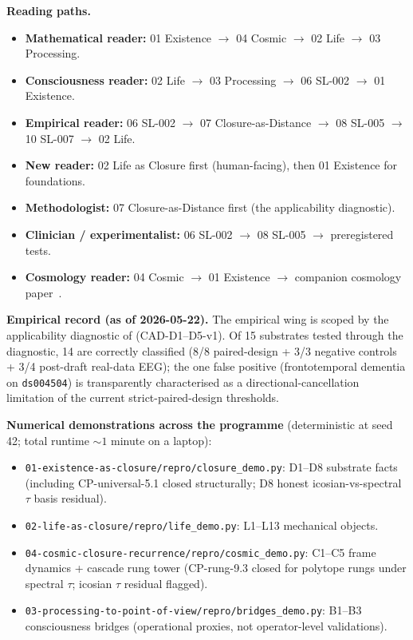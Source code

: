 \documentclass[11pt]{article}
\theoremstyle{plain}
\theoremstyle{definition}
\theoremstyle{remark}
\begin{document}
\textbf{Reading paths.}
\begin{itemize}[leftmargin=2em]
\item \textbf{Mathematical reader:} 01 Existence $\to$ 04 Cosmic $\to$ 02 Life $\to$ 03 Processing.
\item \textbf{Consciousness reader:} 02 Life $\to$ 03 Processing $\to$ 06 SL-002 $\to$ 01 Existence.
\item \textbf{Empirical reader:} 06 SL-002 $\to$ 07 Closure-as-Distance $\to$ 08 SL-005 $\to$ 10 SL-007 $\to$ 02 Life.
\item \textbf{New reader:} 02 Life as Closure first (human-facing), then 01 Existence for foundations.
\item \textbf{Methodologist:} 07 Closure-as-Distance first (the applicability diagnostic).
\item \textbf{Clinician / experimentalist:} 06 SL-002 $\to$ 08 SL-005 $\to$ preregistered tests.
\item \textbf{Cosmology reader:} 04 Cosmic $\to$ 01 Existence $\to$ companion cosmology paper~\citep{SmartHypersphereCosmology}.
\end{itemize}

\textbf{Empirical record (as of 2026-05-22).} The empirical wing is scoped by the applicability diagnostic of \citet{SmartClosureDistance} (CAD-D1--D5-v1). Of 15 substrates tested through the diagnostic, 14 are correctly classified (8/8 paired-design + 3/3 negative controls + 3/4 post-draft real-data EEG); the one false positive (frontotemporal dementia on \texttt{ds004504}) is transparently characterised as a directional-cancellation limitation of the current strict-paired-design thresholds.

\textbf{Numerical demonstrations across the programme} (deterministic at seed 42; total runtime $\sim 1$ minute on a laptop):
\begin{itemize}[leftmargin=2em]
\item \texttt{01-existence-as-closure/repro/closure\_demo.py}: D1--D8 substrate facts (including CP-universal-5.1 closed structurally; D8 honest icosian-vs-spectral $\tau$ basis residual).
\item \texttt{02-life-as-closure/repro/life\_demo.py}: L1--L13 mechanical objects.
\item \texttt{04-cosmic-closure-recurrence/repro/cosmic\_demo.py}: C1--C5 frame dynamics + cascade rung tower (CP-rung-9.3 closed for polytope rungs under spectral $\tau$; icosian $\tau$ residual flagged).
\item \texttt{03-processing-to-point-of-view/repro/bridges\_demo.py}: B1--B3 consciousness bridges (operational proxies, not operator-level validations).
\end{itemize}
\end{document}
